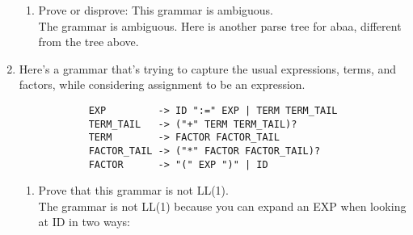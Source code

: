 \documentclass{article}
\begin{document}
\begin{enumerate}
\begin{enumerate}
            \item Prove or disprove: This grammar is ambiguous. \\
                The grammar is ambiguous. Here is another parse tree for abaa, different from the tree above.
        \end{enumerate}
    \pagebreak
    \item Here's a grammar that's trying to capture the usual expressions, terms, and factors, while considering assignment to be an expression.
        \begin{verbatim}
            EXP         -> ID ":=" EXP | TERM TERM_TAIL
            TERM_TAIL   -> ("+" TERM TERM_TAIL)?
            TERM        -> FACTOR FACTOR_TAIL
            FACTOR_TAIL -> ("*" FACTOR FACTOR_TAIL)?
            FACTOR      -> "(" EXP ")" | ID
        \end{verbatim}
        \begin{enumerate}
            \item Prove that this grammar is not LL(1). \\
            The grammar is not LL(1) because you can expand an EXP when looking at ID in two ways:

\end{enumerate}
\end{enumerate}
\end{document}
